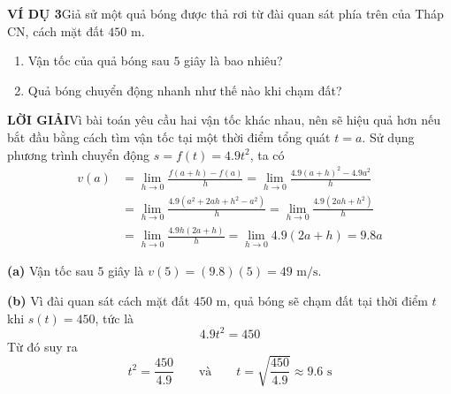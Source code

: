 \begin{minipage}[t]{0.71\textwidth}
    \vspace{6pt}
    \noindent\textbf{\textsf{\color{stewartcyan}VÍ DỤ 3}}\hspace{1em}Giả sử một quả bóng được thả rơi từ đài quan sát phía trên của Tháp CN, cách mặt đất $450\text{ m}$.
    \begin{enumerate}[label=\textbf{(\alph*)}, itemsep=1pt, topsep=2pt, leftmargin=1.5em]
        \item Vận tốc của quả bóng sau $5$ giây là bao nhiêu?
        \item Quả bóng chuyển động nhanh như thế nào khi chạm đất?
    \end{enumerate}

    \vspace{4pt}
    \noindent\textbf{\textsf{\color{stewartcyan}LỜI GIẢI}}\hspace{1em}Vì bài toán yêu cầu hai vận tốc khác nhau, nên sẽ hiệu quả hơn nếu bắt đầu bằng cách tìm vận tốc tại một thời điểm tổng quát $t = a$. Sử dụng phương trình chuyển động $s = f(t) = 4.9t^2$, ta có
    \begin{align*}
    v(a) &= \lim_{h \to 0} \frac{f(a+h) - f(a)}{h} = \lim_{h \to 0} \frac{4.9(a+h)^2 - 4.9a^2}{h} \\[4pt]
    &= \lim_{h \to 0} \frac{4.9(a^2 + 2ah + h^2 - a^2)}{h} = \lim_{h \to 0} \frac{4.9(2ah + h^2)}{h} \\[4pt]
    &= \lim_{h \to 0} \frac{4.9h(2a + h)}{h} = \lim_{h \to 0} 4.9(2a + h) = 9.8a
    \end{align*}

    \noindent\textbf{(a)} Vận tốc sau $5$ giây là $v(5) = (9.8)(5) = 49\text{ m/s}$.

    \vspace{2pt}
    \noindent\textbf{(b)} Vì đài quan sát cách mặt đất $450\text{ m}$, quả bóng sẽ chạm đất tại thời điểm $t$ khi $s(t) = 450$, tức là
    \[
    4.9t^2 = 450
    \]
    Từ đó suy ra
    \[
    t^2 = \frac{450}{4.9} \qquad \text{và} \qquad t = \sqrt{\frac{450}{4.9}} \approx 9.6\text{ s}
    \]
\end{minipage}
